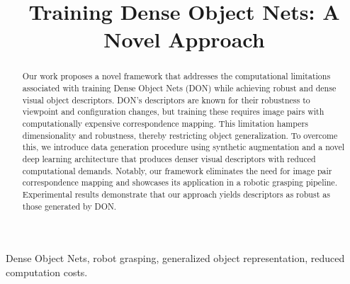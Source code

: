 \documentclass[conference]{IEEEtran}
\begin{document}
\title{Training Dense Object Nets: A Novel Approach}

\author{
    \and
    \and
    \and
}

\maketitle

\begin{abstract}
    Our work proposes a novel framework that addresses the computational limitations associated with training Dense Object Nets (DON)
    while achieving robust and dense visual object descriptors. DON's descriptors are known for their robustness to
    viewpoint and configuration changes, but training these requires image pairs with computationally expensive correspondence mapping.
    This limitation hampers dimensionality and robustness, thereby restricting object generalization.
    To overcome this, we introduce data generation procedure using synthetic augmentation and a novel deep learning architecture
    that produces denser visual descriptors with reduced computational demands. Notably, our framework eliminates the need for
    image pair correspondence mapping and showcases its application in a robotic grasping pipeline.
    Experimental results demonstrate that our approach yields descriptors as robust as those generated by DON.
\end{abstract}

\begin{IEEEkeywords}
    Dense Object Nets, robot grasping, generalized object representation, reduced computation costs.
\end{IEEEkeywords}
\end{document}
